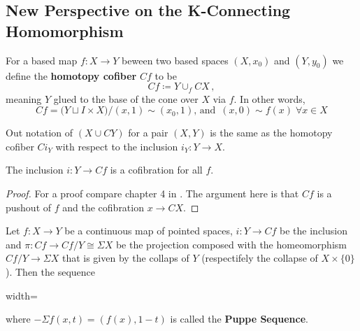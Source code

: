 \subsection{New Perspective on the K-Connecting Homomorphism}
\begin{definition}
	For a based map $f:X\to Y$ beween two based spaces $(X,x_0)$ and $(Y,y_0)$ we define the \textbf{homotopy cofiber} $Cf$ to be 
	\begin{equation*}
		Cf\coloneq Y\cup_f CX\,,
	\end{equation*}meaning $Y$ glued to the base of the cone over $X$ via $f$. In other words, 
	\begin{equation*}
		Cf=\big(Y\sqcup I\times X\big)\big/ (x,1)\sim (x_0,1)\text{, and }\,(x,0)\sim f(x)\; \forall x\in X
	\end{equation*}
\end{definition}
Out notation of $(X\cup CY)$ for a pair $(X,Y)$ is the same as the homotopy cofiber $Ci_Y$ with respect to the inclusion $i_Y:Y\to X$.

\begin{remark}
	The inclusion $i:Y\to Cf$ is a cofibration for all $f$.  
\end{remark}
\begin{proof}
	For a proof compare chapter 4 in \cite{May1999}. The argument here is that $Cf$ is a pushout of $f$ and the cofibration $x\to CX$. 
\end{proof}
\begin{definition}
	Let $f:X\to Y$ be a continuous map of pointed spaces, $i:Y\to Cf$ be the inclusion and $\pi:Cf\to Cf/Y \cong \Sigma X$ be the projection composed with the homeomorphism $Cf/Y\to \Sigma X$ that is given by the collaps of $Y$ (respectifely the collapse of $X\times \{0\}$). Then the sequence 
	\begin{center}
		\begin{adjustbox}{width=\textwidth}
	\end{adjustbox}
	\end{center} 
	where $-\Sigma f(x,t)=(f(x),1-t)$ is called the \textbf{Puppe Sequence}.
\end{definition}

